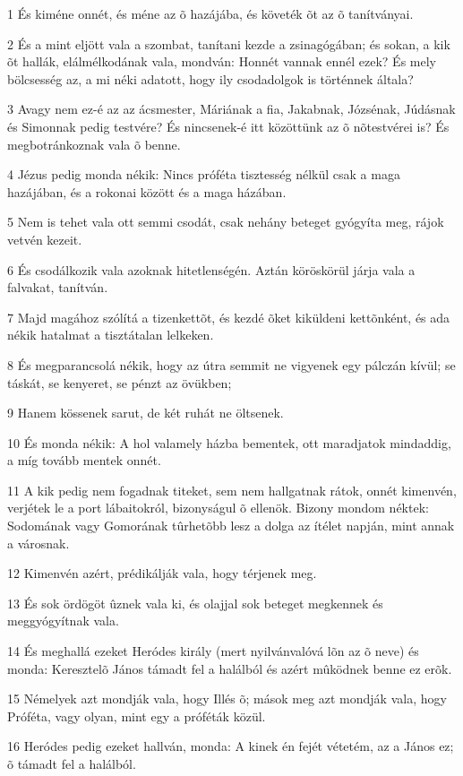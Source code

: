 \par 1 És kiméne onnét, és méne az õ hazájába, és követék õt az õ tanítványai.
\par 2 És a mint eljött vala a szombat, tanítani kezde a zsinagógában; és sokan, a kik õt hallák, elálmélkodának vala, mondván: Honnét vannak ennél ezek? És mely bölcsesség az, a mi néki adatott, hogy ily csodadolgok is történnek általa?
\par 3 Avagy nem ez-é az az ácsmester, Máriának a fia, Jakabnak, Józsénak, Júdásnak és Simonnak pedig testvére? És nincsenek-é itt közöttünk az õ nõtestvérei is? És megbotránkoznak vala õ benne.
\par 4 Jézus pedig monda nékik: Nincs próféta tisztesség nélkül csak a maga hazájában, és a rokonai között és a maga házában.
\par 5 Nem is tehet vala ott semmi csodát, csak nehány beteget gyógyíta meg, rájok vetvén kezeit.
\par 6 És csodálkozik vala azoknak hitetlenségén. Aztán köröskörül járja vala a falvakat, tanítván.
\par 7 Majd magához szólítá a tizenkettõt, és kezdé õket kiküldeni  kettõnként, és ada nékik hatalmat a tisztátalan lelkeken.
\par 8 És megparancsolá nékik, hogy az útra semmit ne vigyenek egy pálczán kívül; se táskát, se kenyeret, se pénzt az övükben;
\par 9 Hanem kössenek sarut, de két ruhát ne öltsenek.
\par 10 És monda nékik: A hol valamely házba bementek, ott maradjatok mindaddig, a míg tovább mentek onnét.
\par 11 A kik pedig nem fogadnak titeket, sem nem hallgatnak rátok, onnét kimenvén, verjétek le a port lábaitokról, bizonyságul õ ellenök. Bizony mondom néktek: Sodomának vagy Gomorának tûrhetõbb lesz a dolga az ítélet napján, mint annak a városnak.
\par 12 Kimenvén azért, prédikálják vala, hogy térjenek meg.
\par 13 És sok ördögöt ûznek vala ki, és olajjal sok beteget megkennek és meggyógyítnak vala.
\par 14 És meghallá ezeket Heródes király (mert nyilvánvalóvá lõn az õ neve) és monda: Keresztelõ János támadt fel a halálból és azért mûködnek benne ez erõk.
\par 15 Némelyek azt mondják vala, hogy Illés õ; mások meg azt mondják vala, hogy Próféta, vagy olyan, mint egy a próféták közül.
\par 16 Heródes pedig ezeket hallván, monda: A kinek én fejét vétetém, az a János ez; õ támadt fel a halálból.
